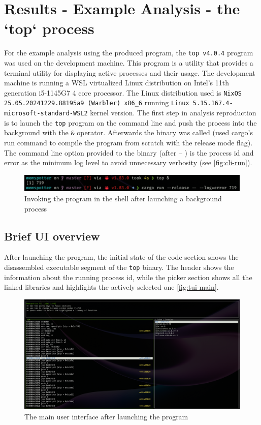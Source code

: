 \chapter{Results - Example Analysis - the `top` process}
\label{cha:results}

For the example analysis using the produced program, the \verb|top v4.0.4| \cite{warner_procps-ng_2023} program was used on the development machine.
This program is a utility that provides a terminal utility for displaying active processes and their usage.
The development machine is running a WSL virtualized Linux distribution on Intel's 11th generation i5-1145G7 4 core processor. 
The Linux distribution used is \verb|NixOS 25.05.20241229.88195a9 (Warbler) x86_6| running \verb|Linux 5.15.167.4-microsoft-standard-WSL2| kernel version.
The first step in analysis reproduction is to launch the \verb|top| program on the command line and push the process into the background with the \verb|&| operator.
Afterwards the binary was called (used cargo's run command to compile the program from scratch with the release mode flag). The command line option provided to the binary (after -- ) is the process id and error as the minimum log level to avoid unnecessary verbosity (see \autoref{fig:cli-run}).

\begin{figure}
    \centering
    \includegraphics[width=1\linewidth]{cli-run.png}
    \caption{Invoking the program in the shell after launching a background process}
    \label{fig:cli-run}
\end{figure}

\section{Brief UI overview}

After launching the program, the initial state of the code section shows the disassembled executable segment of the \verb|top| binary.
The header shows the information about the running process id, while the picker section shows all the linked libraries and highlights the actively selected one \autoref{fig:tui-main}.

\begin{figure}
    \centering
    \includegraphics[width=1\linewidth]{tui-main.png}
    \caption{The main user interface after launching the program}
    \label{fig:tui-main}
\end{figure}

